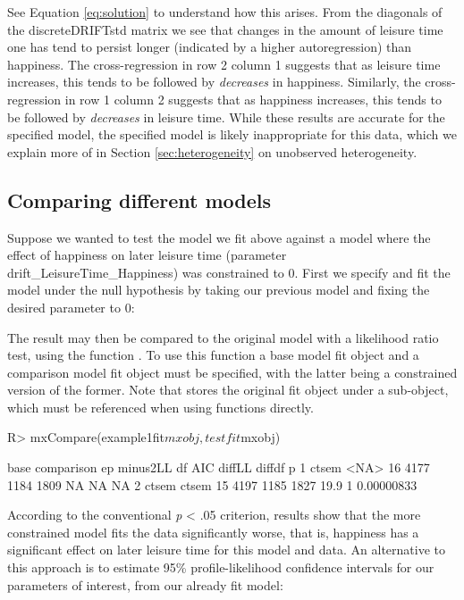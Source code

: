 \documentclass[nojss]{jss}\usepackage[]{graphicx}\usepackage[]{color}
\begin{document}
See Equation \ref{eq:solution} to understand how this arises. From the diagonals of the discreteDRIFTstd matrix we see that changes in the amount of leisure time one has tend to persist longer (indicated by a higher autoregression) than happiness. The cross-regression in row 2 column 1 suggests that as leisure time increases, this tends to be followed by \textit{decreases} in happiness. Similarly, the cross-regression in row 1 column 2 suggests that as happiness increases, this tends to be followed by \textit{decreases} in leisure time. While these results are accurate for the specified model, the specified model is likely inappropriate for this data, which we explain more of in Section \ref{sec:heterogeneity} on unobserved heterogeneity.

\subsection{Comparing different models} \label{sec:testing}\nopagebreak
Suppose we wanted to test the model we fit above against a model where the effect of happiness on later leisure time (parameter drift\_LeisureTime\_Happiness) was constrained to 0. First we specify and fit the model under the null hypothesis by taking our previous model and fixing the desired parameter to 0:

\begin{Schunk}
\end{Schunk}

The result may then be compared to the original model with a likelihood ratio test, using the  function . To use this function a base model fit object and a comparison model fit object must be specified, with the latter being a constrained version of the former. Note that  stores the original  fit object under a  sub-object, which must be referenced when using  functions directly.
\begin{Schunk}
\begin{Sinput}
R> mxCompare(example1fit$mxobj, testfit$mxobj)
\end{Sinput}
\begin{Soutput}
   base comparison ep minus2LL   df  AIC diffLL diffdf          p
1 ctsem       <NA> 16     4177 1184 1809     NA     NA         NA
2 ctsem      ctsem 15     4197 1185 1827   19.9      1 0.00000833
\end{Soutput}
\end{Schunk}
According to the conventional \textit{p} < .05 criterion, results show that the more constrained model fits the data significantly worse, that is, happiness has a significant effect on later leisure time for this model and data. 
An alternative to this approach is to estimate 95\% profile-likelihood confidence intervals for our parameters of interest, from our already fit model:
\end{document}
